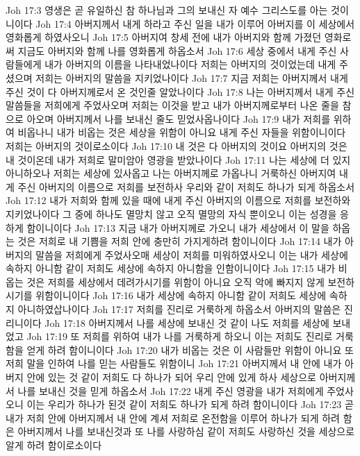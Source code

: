 Joh 17:3  영생은 곧 유일하신 참 하나님과 그의 보내신 자 예수 그리스도를 아는 것이니이다
Joh 17:4  아버지께서 내게 하라고 주신 일을 내가 이루어 아버지를 이 세상에서 영화롭게 하였사오니
Joh 17:5  아버지여 창세 전에 내가 아버지와 함께 가졌던 영화로써 지금도 아버지와 함께 나를 영화롭게 하옵소서
Joh 17:6  세상 중에서 내게 주신 사람들에게 내가 아버지의 이름을 나타내었나이다 저희는 아버지의 것이었는데 내게 주셨으며 저희는 아버지의 말씀을 지키었나이다
Joh 17:7  지금 저희는 아버지께서 내게 주신 것이 다 아버지께로서 온 것인줄 알았나이다
Joh 17:8  나는 아버지께서 내게 주신 말씀들을 저희에게 주었사오며 저희는 이것을 받고 내가 아버지께로부터 나온 줄을 참으로 아오며 아버지께서 나를 보내신 줄도 믿었사옵나이다
Joh 17:9  내가 저희를 위하여 비옵나니 내가 비옵는 것은 세상을 위함이 아니요 내게 주신 자들을 위함이니이다 저희는 아버지의 것이로소이다
Joh 17:10  내 것은 다 아버지의 것이요 아버지의 것은 내 것이온데 내가 저희로 말미암아 영광을 받았나이다
Joh 17:11  나는 세상에 더 있지 아니하오나 저희는 세상에 있사옵고 나는 아버지께로 가옵나니 거룩하신 아버지여 내게 주신 아버지의 이름으로 저희를 보전하사 우리와 같이 저희도 하나가 되게 하옵소서
Joh 17:12  내가 저희와 함께 있을 때에 내게 주신 아버지의 이름으로 저희를 보전하와 지키었나이다 그 중에 하나도 멸망치 않고 오직 멸망의 자식 뿐이오니 이는 성경을 응하게 함이니이다
Joh 17:13  지금 내가 아버지께로 가오니 내가 세상에서 이 말을 하옵는 것은 저희로 내 기쁨을 저희 안에 충만히 가지게하려 함이니이다
Joh 17:14  내가 아버지의 말씀을 저희에게 주었사오매 세상이 저희를 미워하였사오니 이는 내가 세상에 속하지 아니함 같이 저희도 세상에 속하지 아니함을 인함이니이다
Joh 17:15  내가 비옵는 것은 저희를 세상에서 데려가시기를 위함이 아니요 오직 악에 빠지지 않게 보전하시기를 위함이니이다
Joh 17:16  내가 세상에 속하지 아니함 같이 저희도 세상에 속하지 아니하였삽나이다
Joh 17:17  저희를 진리로 거룩하게 하옵소서 아버지의 말씀은 진리니이다
Joh 17:18  아버지께서 나를 세상에 보내신 것 같이 나도 저희를 세상에 보내었고
Joh 17:19  또 저희를 위하여 내가 나를 거룩하게 하오니 이는 저희도 진리로 거룩함을 얻게 하려 함이니이다
Joh 17:20  내가 비옵는 것은 이 사람들만 위함이 아니요 또 저희 말을 인하여 나를 믿는 사람들도 위함이니
Joh 17:21  아버지께서 내 안에 내가 아버지 안에 있는 것 같이 저희도 다 하나가 되어 우리 안에 있게 하사 세상으로 아버지께서 나를 보내신 것을 믿게 하옵소서
Joh 17:22  내게 주신 영광을 내가 저희에게 주었사오니 이는 우리가 하나가 된것 같이 저희도 하나가 되게 하려 함이니이다
Joh 17:23  곧 내가 저희 안에 아버지께서 내 안에 계셔 저희로 온전함을 이루어 하나가 되게 하려 함은 아버지께서 나를 보내신것과 또 나를 사랑하심 같이 저희도 사랑하신 것을 세상으로 알게 하려 함이로소이다
